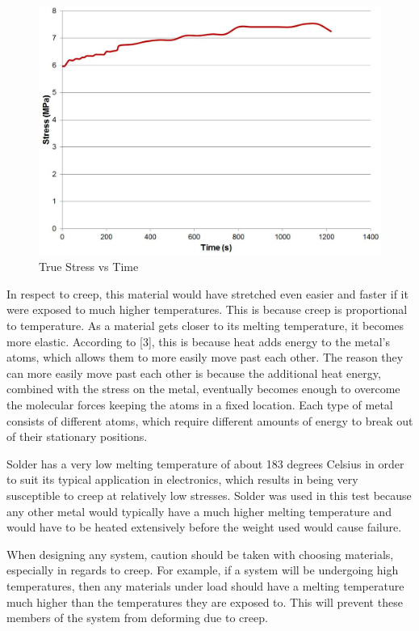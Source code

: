 \documentclass[12pt]{article}
\begin{document}
\begin{figure}[htbp] %
   \centering
   \includegraphics[width=\linewidth]{t_stress_vs_time.jpg} 
   \caption{True Stress vs Time}
\end{figure}
\bigskip


In respect to creep, this material would have stretched even easier and faster if it were exposed to much higher temperatures. This is because creep is proportional to temperature. As a material gets closer to its melting temperature, it becomes more elastic. According to [3], this is because heat adds energy to the metal's atoms, which allows them to more easily move past each other. The reason they can more easily move past each other is because the additional heat energy, combined with the stress on the metal, eventually becomes enough to overcome the molecular forces keeping the atoms in a fixed location. Each type of metal consists of different atoms, which require different amounts of energy to break out of their stationary positions. 
\bigskip

Solder has a very low melting temperature of about 183 degrees Celsius in order to suit its typical application in electronics, which results in being very susceptible to creep at relatively low stresses. Solder was used in this test because any other metal would typically have a much higher melting temperature and would have to be heated extensively before the weight used would cause failure. 
\bigskip

When designing any system, caution should be taken with choosing materials, especially in regards to creep. For example, if a system will be undergoing high temperatures, then any materials under load should have a melting temperature much higher than the temperatures they are exposed to. This will prevent these members of the system from deforming due to creep.
\end{document}
